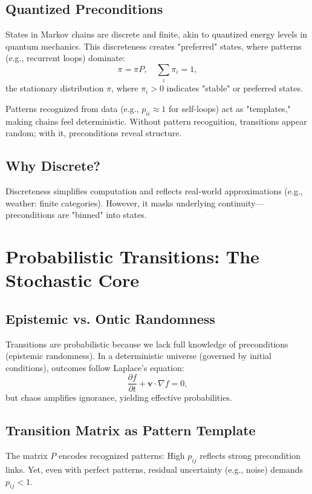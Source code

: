 \documentclass[12pt,a4paper]{article}
\begin{document}
	\subsection{Quantized Preconditions}
	States in Markov chains are discrete and finite, akin to quantized energy levels in quantum mechanics. This discreteness creates "preferred" states, where patterns (e.g., recurrent loops) dominate:
	\begin{equation}
		\pi = \pi P, \quad \sum_i \pi_i = 1,
	\end{equation}
	the stationary distribution $\pi$, where $\pi_i > 0$ indicates "stable" or preferred states.
	
	Patterns recognized from data (e.g., $p_{ii} \approx 1$ for self-loops) act as "templates," making chains feel deterministic. Without pattern recognition, transitions appear random; with it, preconditions reveal structure.
	
	\subsection{Why Discrete?}
	Discreteness simplifies computation and reflects real-world approximations (e.g., weather: finite categories). However, it masks underlying continuity—preconditions are "binned" into states.
	
	\section{Probabilistic Transitions: The Stochastic Core}
	\label{sec:probabilistic}
	
	\subsection{Epistemic vs. Ontic Randomness}
	Transitions are probabilistic because we lack full knowledge of preconditions (epistemic randomness). In a deterministic universe (governed by initial conditions), outcomes follow Laplace's equation:
	\begin{equation}
		\frac{\partial f}{\partial t} + \mathbf{v} \cdot \nabla f = 0,
	\end{equation}
	but chaos amplifies ignorance, yielding effective probabilities.
	
	\subsection{Transition Matrix as Pattern Template}
	The matrix $P$ encodes recognized patterns: High $p_{ij}$ reflects strong precondition links. Yet, even with perfect patterns, residual uncertainty (e.g., noise) demands $p_{ij} < 1$.
	
\end{document}
